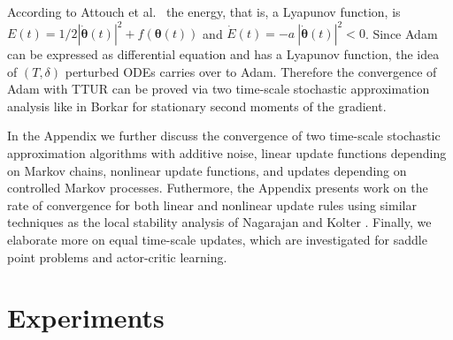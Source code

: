 \documentclass{article}
\newcommand\Bth{\bm{\theta}}
\begin{document}
According to Attouch et al.\ \cite{Attouch:00} the energy, that is,
a Lyapunov function, is $E(t) =  1/2 | \dot{\Bth}(t) |^2 + f(\Bth(t))$
and $\dot{E}(t) = - a \ | \dot{\Bth}(t) |^2 < 0$.
Since Adam can be expressed as differential equation and has a
Lyapunov function, the idea of
$(T,\delta)$ perturbed ODEs \cite{Borkar:97,Hirsch:89,Borkar:00}
carries over to Adam.
Therefore the convergence of Adam with TTUR can be proved via two time-scale stochastic
approximation analysis like in Borkar \cite{Borkar:97}
for stationary second moments of the gradient.

In the Appendix we further discuss the convergence of two time-scale
stochastic approximation algorithms with additive noise, linear update
functions depending on Markov chains, nonlinear update functions,
and updates depending on controlled Markov processes. Futhermore, the Appendix
presents work on the rate of convergence for both linear and nonlinear update
rules using similar techniques as the local stability analysis of Nagarajan
and Kolter \cite{Nagarajan:17}.
Finally, we elaborate more on equal time-scale updates, which
are investigated for saddle point problems and actor-critic learning.

\section*{Experiments}
\label{sec:experiments}
\end{document}
